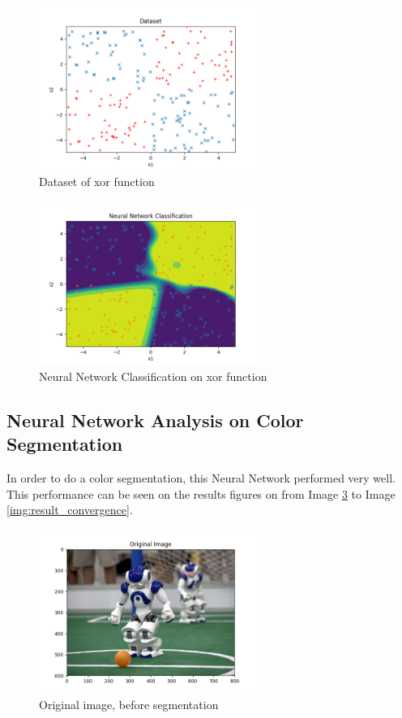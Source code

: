 \documentclass[journal]{IEEEtran}
\begin{document}
\begin{figure}
  \begin{center}
  \includegraphics[width=2.8in]{./../code/result_xor/dataset.png}
  \caption{Dataset of xor function}
  \label{img:xor_data_set}
  \end{center}
\end{figure}

\begin{figure}
  \begin{center}
  \includegraphics[width=2.8in]{./../code/result_xor/neural_net_classification.png}
  \caption{Neural Network Classification on xor function}
  \label{img:xor_classification}
  \end{center}
\end{figure}

\subsection{Neural Network Analysis on Color Segmentation}

In order to do a color segmentation, this Neural Network performed very well. This performance can be seen on the results figures on from Image \ref{img:result_original_img} to Image \ref{img:result_convergence}.

\begin{figure}
  \begin{center}
  \includegraphics[width=2.8in]{./../code/result/original_image.png}
  \caption{Original image, before segmentation}
  \label{img:result_original_img}
  \end{center}
\end{figure}
\end{document}
